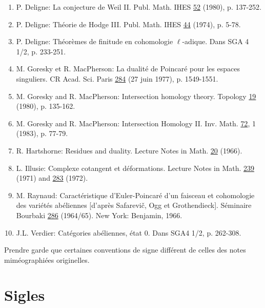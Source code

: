 \documentclass[12pt,a4paper]{article}
\theoremstyle{plain}
\theoremstyle{definition}
\theoremstyle{remark}
\begin{document}
\begin{enumerate}
\item[{[1]}] P. Deligne: La conjecture de Weil II. Publ. Math. IHES \underline{52} (1980), p. 137-252.

\item[{[2]}] P. Deligne: Th\'eorie de Hodge III. Publ. Math. IHES \underline{44} (1974), p. 5-78.

\item[{[3]}] P. Deligne: Th\'eor\`emes de finitude en cohomologie $\ell$-adique. Dans SGA 4 1/2, p. 233-251.

\item[{[4]}] M. Goresky et R. MacPherson: La dualit\'e de Poincar\'e pour les espaces singuliers. CR Acad. Sci. Paris \underline{284} (27 juin 1977), p. 1549-1551.

\item[{[5]}] M. Goresky and R. MacPherson: Intersection homology theory. Topology \underline{19} (1980), p. 135-162.

\item[{[6]}] M. Goresky and R. MacPherson: Intersection Homology II. Inv. Math. \underline{72}, 1 (1983), p. 77-79.

\item[{[7]}] R. Hartshorne: Residues and duality. Lecture Notes in Math. \underline{20} (1966).

\item[{[8]}] L. Illusie: Complexe cotangent et d\'eformations. Lecture Notes in Math. \underline{239} (1971) and \underline{283} (1972).

\item[{[9]}] M. Raynaud: Caract\'eristique d'Euler-Poincar\'e d'un faisceau et cohomologie des vari\'et\'es ab\'eliennes [d'apr\`es Safarevi\v{c}, Ogg et Grothendieck]. S\'eminaire Bourbaki \underline{286} (1964/65). New York: Benjamin, 1966.

\item[{[10]}] J.L. Verdier: Cat\'egories ab\'eliennes, \'etat 0. Dans SGA4 1/2, p. 262-308.
\end{enumerate}

\medskip
Prendre garde que certaines conventions de signe diff\'erent de celles des notes mim\'eographi\'ees originelles.

\newpage
\section*{Sigles}
\end{document}
